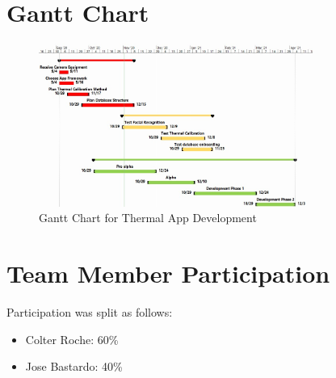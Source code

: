 \documentclass[12pt, letterpaper]{article}
\begin{document}
    \section{Gantt Chart}
    \begin{figure}[h!]
        \centering
        \includegraphics[width=0.8\textwidth]{Gantt Chart v3.jpg}
        \caption{Gantt Chart for Thermal App Development}
    \end{figure}
    \section{Team Member Participation}
    Participation was split as follows:
    \begin{itemize}
        \item Colter Roche: 60\%
        \item Jose Bastardo: 40\%
    \end{itemize}
\end{document}

